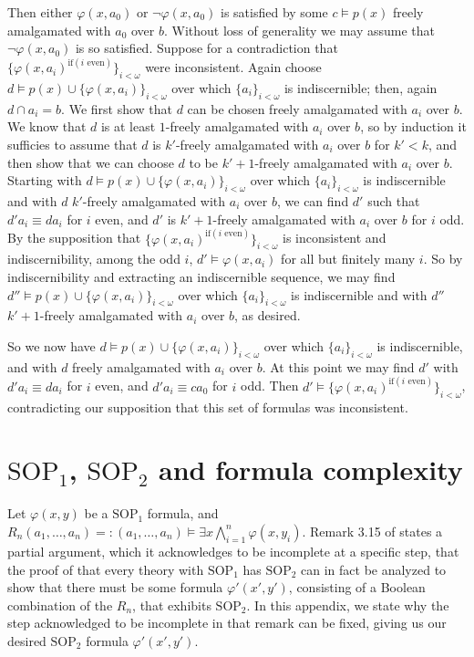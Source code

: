 \documentclass{article}
\theoremstyle{definition}
\theoremstyle{definition}
\theoremstyle{definition}
\begin{document}
    
    Then either $\varphi(x, a_{0})$ or $\neg\varphi(x, a_{0})$ is satisfied by some $c \models p(x)$ freely amalgamated with $a_{0}$ over $b$. Without loss of generality we may assume that $\neg \varphi(x, a_{0})$ is so satisfied. Suppose for a contradiction that $\{\varphi(x, a_{i})^{\text{if}(i \text{ even})} \}_{ i < \omega}$ were inconsistent. Again choose $d \models p(x) \cup \{\varphi(x, a_{i})\}_{ i < \omega}$ over which $\{a_{i}\}_{i< \omega}$ is indiscernible; then, again $d \cap a_{i} = b$. We first show that $d$ can be chosen freely amalgamated with $a_{i}$ over $b$. We know that $d$ is at least $1$-freely amalgamated with $a_{i}$ over $b$, so by induction it sufficies to assume that $d$ is $k'$-freely amalgamated with $a_{i}$ over $b$ for $k' < k$, and then show that we can choose $d$ to be $k'+1$-freely amalgamated with $a_{i}$ over $b$. Starting with $d \models p(x) \cup \{\varphi(x, a_{i})\}_{ i < \omega}$ over which $\{a_{i}\}_{i< \omega}$ is indiscernible and with $d$ $k'$-freely amalgamated with $a_{i}$ over $b$, we can find $d'$ such that $d'a_{i} \equiv da_{i}$ for $i$ even, and $d'$ is $k'+1$-freely amalgamated with $a_{i}$ over $b$ for $i$ odd. By the supposition that $\{\varphi(x, a_{i})^{\text{if}(i \text{ even})} \}_{ i < \omega}$ is inconsistent and indiscernibility, among the odd $i$, $d' \models \varphi(x, a_{i})$ for all but finitely many $i$. So by indiscernibility and extracting an indiscernible sequence, we may find $d'' \models p(x) \cup \{\varphi(x, a_{i})\}_{ i < \omega}$ over which $\{a_{i}\}_{i< \omega}$ is indiscernible and with $d''$ $k'+1$-freely amalgamated with $a_{i}$ over $b$, as desired.

    So we now have $d \models p(x) \cup \{\varphi(x, a_{i})\}_{ i < \omega}$ over which $\{a_{i}\}_{i< \omega}$ is indiscernible, and with $d$ freely amalgamated with $a_{i}$ over $b$. At this point we may find $d'$ with $d'a_{i} \equiv da_{i}$ for $i$ even, and $d'a_{i} \equiv c a_{0}$ for $i $ odd. Then $d' \models \{\varphi(x, a_{i})^{\text{if}(i \text{ even})} \}_{ i < \omega} $, contradicting our supposition that this set of formulas was inconsistent.

\section{ $\mathrm{SOP}_{1}$, $ \mathrm{SOP}_{2}$ and formula complexity}\label{formula complexity sop1 sop2}

Let $\varphi(x, y)$ be a $\mathrm{SOP}_{1}$ formula, and $R_{n}(a_{1}, \ldots, a_{n}) =: (a_{1}, \ldots, a_{n}) \models \exists x \bigwedge_{i=1}^{n}\varphi(x, y_{i})$. Remark 3.15 of \cite{mutchnik2023properties} states a partial argument, which it acknowledges to be incomplete at a specific step, that the proof of \cite{Mutchnik2026nsop2} that every theory with $\mathrm{SOP}_{1}$ has $\mathrm{SOP}_{2}$ can in fact be analyzed to show that there must be some formula $\varphi'(x', y')$, consisting of a Boolean combination of the $R_{n}$, that exhibits $\mathrm{SOP}_{2}$. In this appendix, we state why the step acknowledged to be incomplete in that remark can be fixed, giving us our desired $\mathrm{SOP}_{2}$ formula $\varphi'(x', y')$.
\end{document}
